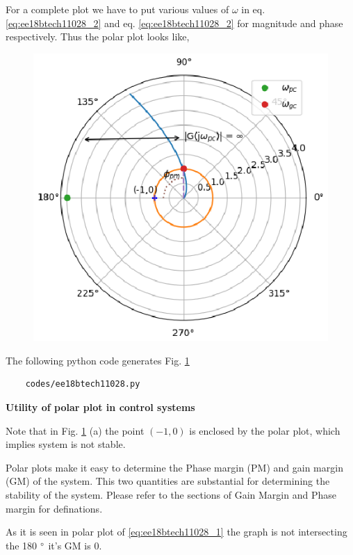\begin{enumerate}[label=\thesection.\arabic*.,ref=\thesection.\theenumi]
For a complete plot we have to put various values of $\omega$ in 
eq. \ref{eq:ee18btech11028_2} and eq. \ref{eq:ee18btech11028_2} for magnitude and phase respectively.
Thus the polar plot looks like, 
\begin{figure}[!h]
    \includegraphics[width=\columnwidth]{./figs/ee18btech11028/ee18btech11028.eps}
  \caption{}
  \label{fig:ee18btech11028_fig1}
\end{figure}

The following python code generates  Fig. \ref{fig:ee18btech11028_fig1}
\begin{lstlisting}
    codes/ee18btech11028.py
\end{lstlisting}
\textbf{Utility of polar plot in control systems}

Note that in Fig. \ref{fig:ee18btech11028_fig1} (a) the point $(-1,0)$ is enclosed by the polar plot,
which implies system is not stable.


Polar plots make it easy to determine the Phase margin (PM) and gain margin (GM) of the system.
This two quantities are substantial for determining the stability of the system.
Please refer to the sections of Gain Margin and Phase margin for definations.

As it is seen in polar plot of \eqref{eq:ee18btech11028_1} the graph is not intersecting the 180 $\degree$
it's GM is 0.






\end{enumerate}
